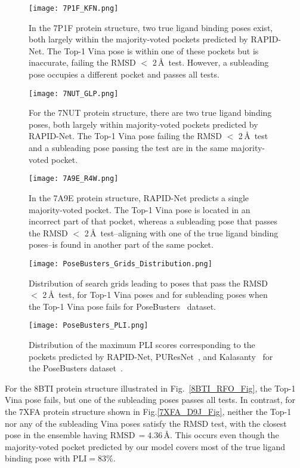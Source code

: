 \documentclass[10pt,conference]{IEEEtran}
\begin{document}
\begin{figure}[]{}
\texttt{[image: 7P1F\_KFN.png]}
\caption{In the 7P1F protein structure, two true ligand binding poses exist, both largely within the majority-voted pockets predicted by RAPID-Net. The Top-1 Vina pose is within one of these pockets but is inaccurate, failing the RMSD $<$ 2\,\AA\ test. However, a subleading pose occupies a different pocket and passes all tests.}
\label{7P1F_KFN_Fig}
\end{figure}
\begin{figure}[]{}
\texttt{[image: 7NUT\_GLP.png]}
\caption{For the 7NUT protein structure, there are two true ligand binding poses, both largely within majority-voted pockets predicted by RAPID-Net. The Top-1 Vina pose failing the RMSD $<$ 2\,\AA\ test and a subleading pose passing the test are in the same majority-voted pocket.}
\label{7NUT_GLP_Fig}
\end{figure}
\begin{figure}[]{}
\texttt{[image: 7A9E\_R4W.png]}
\caption{In the 7A9E protein structure, RAPID-Net predicts a single majority-voted pocket. The Top-1 Vina pose is located in an incorrect part of that pocket, whereas a subleading pose that passes the RMSD $<$ 2\,\AA\ test--aligning with one of the true ligand binding poses--is found in another part of the same pocket.}
\label{7A9E_R4W_Fig}
\end{figure}





\begin{figure}[]{}
\texttt{[image: PoseBusters\_Grids\_Distribution.png]}
\caption{Distribution of search grids leading to poses that pass the RMSD $<$ 2\,\AA\ test, for Top-1 Vina poses and for subleading poses when the Top-1 Vina pose fails for PoseBusters~\cite{Buttenschoen2024} dataset.}
\label{PB_Grids_Fig}
\end{figure}
\begin{figure}[]{}
\texttt{[image: PoseBusters\_PLI.png]}
\caption{Distribution of the maximum PLI scores corresponding to the pockets predicted by RAPID-Net, PUResNet~\cite{kandel2021puresnet}, and Kalasanty~\cite{stepniewska2020improving} for the PoseBusters dataset~\cite{Buttenschoen2024}.}
\label{PB_PLI_Fig}
\end{figure}

For the 8BTI protein structure illustrated in Fig.~\ref{8BTI_RFO_Fig}, the Top-1 Vina pose fails, but one of the subleading poses passes all tests. In contrast, for the 7XFA protein structure shown in Fig.\ref{7XFA_D9J_Fig}, neither the Top-1 nor any of the subleading Vina poses satisfy the RMSD test, with the closest pose in the ensemble having $\text{RMSD}\,=4.36\,\text{\AA}$. This occurs even though the majority-voted pocket predicted by our model covers most of the true ligand binding pose with $\text{PLI} = 83\%$.
\end{document}
